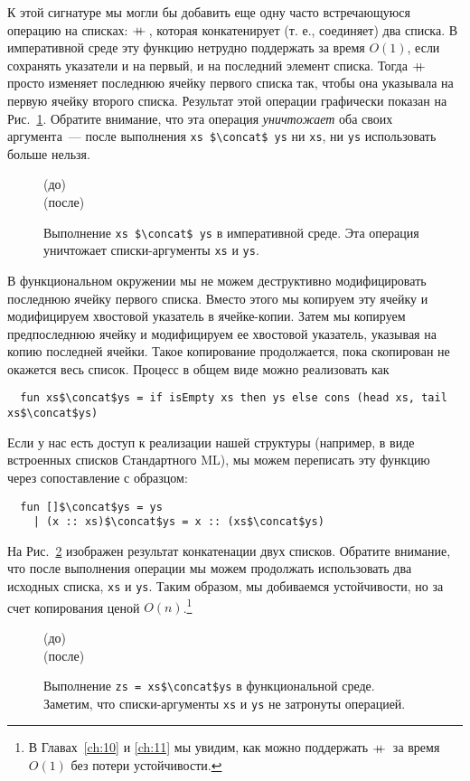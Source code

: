 К этой сигнатуре мы могли бы добавить еще одну часто встречающуюся
операцию на списках: $+\!\!\!+\,$, которая конкатенирует (т. е.,
соединяет) два списка. В императивной среде эту функцию нетрудно
поддержать за время $O(1)$, если сохранять указатели и на первый, и на
последний элемент списка.  Тогда $+\!\!\!+\,$ просто изменяет последнюю
ячейку первого списка так, чтобы она указывала на первую ячейку
второго списка.  Результат этой операции графически показан на
Рис.~\ref{fig:2.4}. Обратите внимание, что эта операция
\emph{уничтожает} оба своих аргумента~--- после выполнения
\lstinline!xs $\concat$ ys! ни \lstinline!xs!, ни \lstinline!ys! использовать
больше нельзя.

\begin{figure}
  \centering
  (до)\\
  (после)\\
  \caption{Выполнение \lstinline!xs $\concat$ ys! в императивной среде. Эта операция уничтожает списки-аргументы \lstinline!xs! и \lstinline!ys!.}
  \label{fig:2.4}
\end{figure}

В функциональном окружении мы не можем деструктивно модифицировать
последнюю ячейку первого списка. Вместо этого мы копируем эту ячейку и
модифицируем хвостовой указатель в ячейке-копии. Затем мы копируем
предпоследнюю ячейку и модифицируем ее хвостовой указатель, указывая
на копию последней ячейки.  Такое копирование продолжается, пока
скопирован не окажется весь список. Процесс в общем виде можно
реализовать как
\begin{lstlisting}
  fun xs$\concat$ys = if isEmpty xs then ys else cons (head xs, tail xs$\concat$ys)
\end{lstlisting}
Если у нас есть доступ к реализации нашей структуры (например, в виде
встроенных списков Стандартного ML), мы можем переписать эту функцию
через сопоставление с образцом:
\begin{lstlisting}
  fun []$\concat$ys = ys
    | (x :: xs)$\concat$ys = x :: (xs$\concat$ys)
\end{lstlisting}
На Рис.~\ref{fig:2.5} изображен результат конкатенации двух
списков. Обратите внимание, что после выполнения операции мы можем
продолжать использовать два исходных списка, \lstinline!xs! и
\lstinline!ys!. Таким образом, мы добиваемся устойчивости, но за счет
копирования ценой $O(n)$.\footnote{%
  В Главах~\ref{ch:10} и \ref{ch:11} мы увидим, как можно поддержать
  $+\!\!\!+\,$ за время $O(1)$ без потери устойчивости.
}

\begin{figure}
  \centering
  (до)\\
  (после)\\
  \caption{Выполнение \lstinline!zs = xs$\concat$ys! в функциональной среде. Заметим, что списки-аргументы \lstinline!xs! и \lstinline!ys! не затронуты операцией.}
  \label{fig:2.5}
\end{figure}

